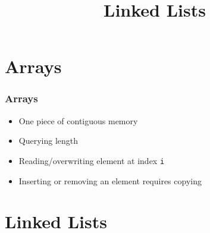 \documentclass{../ucll-slides}
\title{Linked Lists}
\begin{document}
\maketitle

\section{Arrays}

\begin{frame}
    \frametitle{Arrays}
    \begin{center}
    \end{center}
    \vskip4mm
    \begin{itemize}
        \item One piece of contiguous memory
    \end{itemize}
    \vskip4mm
    \begin{itemize}
        \item Querying length
        \item Reading/overwriting element at index \texttt{i}
    \end{itemize}
    \vskip4mm
    \begin{itemize}
        \item Inserting or removing an element requires copying
    \end{itemize}
\end{frame}

\section{Linked Lists}
\end{document}
